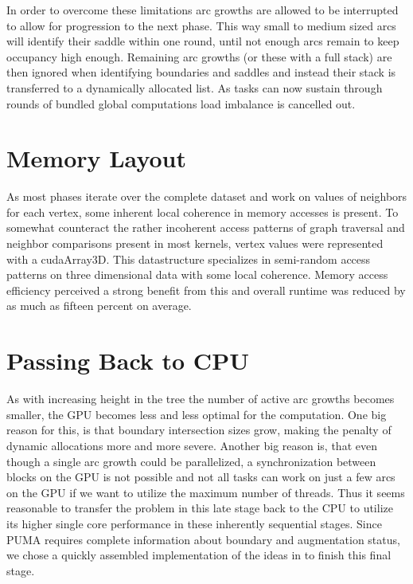 \documentclass[%
	paper=A4,					%
	twoside=true,				%
	openright,					%
	parskip=full,				%
	chapterprefix=true,			%
	11pt,						%
	headings=normal,			%
	bibliography=totoc,			%
	listof=totoc,				%
	titlepage=on,				%
	captions=tableabove,		%
	draft=false,				%
]{scrreprt}%
\begin{document}
In order to overcome these limitations arc growths are allowed to be interrupted to allow for progression to the next phase. This way small to medium sized arcs will identify their saddle within one round, until not enough arcs remain to keep occupancy high enough. Remaining arc growths (or these with a full stack) are then ignored when identifying boundaries and saddles and instead their stack is transferred to a dynamically allocated list. As tasks can now sustain through rounds of bundled global computations load imbalance is cancelled out. 

\section{Memory Layout}
As most phases iterate over the complete dataset and work on values of neighbors for each vertex, some inherent local coherence in memory accesses is present. To somewhat counteract the rather incoherent access patterns of graph traversal and neighbor comparisons present in most kernels, vertex values were represented with a cudaArray3D. This datastructure specializes in semi-random access patterns on three dimensional data with some local coherence. Memory access efficiency perceived a strong benefit from this and overall runtime was reduced by as much as fifteen percent on average. 

\section{Passing Back to CPU}
As with increasing height in the tree the number of active arc growths becomes smaller, the GPU becomes less and less optimal for the computation. One big reason for this, is that boundary intersection sizes grow, making the penalty of dynamic allocations more and more severe. Another big reason is, that even though a single arc growth could be parallelized, a synchronization between blocks on the GPU is not possible and not all tasks can work on just a few arcs on the GPU if we want to utilize the maximum number of threads. Thus it seems reasonable to transfer the problem in this late stage back to the CPU to utilize its higher single core performance in these inherently sequential stages. Since PUMA requires complete information about boundary and augmentation status, we chose a quickly assembled implementation of the ideas in \cite{FTM} to finish this final stage. 
\end{document}
